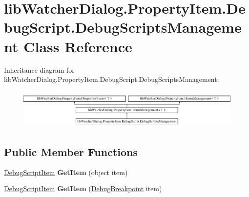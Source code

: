 \hypertarget{classlib_watcher_dialog_1_1_property_item_1_1_debug_script_1_1_debug_scripts_management}{\section{lib\+Watcher\+Dialog.\+Property\+Item.\+Debug\+Script.\+Debug\+Scripts\+Management Class Reference}
\label{classlib_watcher_dialog_1_1_property_item_1_1_debug_script_1_1_debug_scripts_management}
}
Inheritance diagram for lib\+Watcher\+Dialog.\+Property\+Item.\+Debug\+Script.\+Debug\+Scripts\+Management\+:\begin{figure}[H]
\begin{center}
\leavevmode
\includegraphics[height=2.014389cm]{classlib_watcher_dialog_1_1_property_item_1_1_debug_script_1_1_debug_scripts_management}
\end{center}
\end{figure}
\subsection*{Public Member Functions}
\begin{DoxyCompactItemize}
\item 
\hypertarget{classlib_watcher_dialog_1_1_property_item_1_1_debug_script_1_1_debug_scripts_management_ad36561f17343d22ffec46c6e597396d6}{\hyperlink{classlib_watcher_dialog_1_1_property_item_1_1_debug_script_1_1_debug_script_item}{Debug\+Script\+Item} {\bfseries Get\+Item} (object item)}\label{classlib_watcher_dialog_1_1_property_item_1_1_debug_script_1_1_debug_scripts_management_ad36561f17343d22ffec46c6e597396d6}

\item 
\hypertarget{classlib_watcher_dialog_1_1_property_item_1_1_debug_script_1_1_debug_scripts_management_a25b8e9fbe937bdc53baccec59946a679}{\hyperlink{classlib_watcher_dialog_1_1_property_item_1_1_debug_script_1_1_debug_script_item}{Debug\+Script\+Item} {\bfseries Get\+Item} (\hyperlink{classlib_wather_debugger_1_1_breakpoint_1_1_debug_breakpoint}{Debug\+Breakpoint} item)}\label{classlib_watcher_dialog_1_1_property_item_1_1_debug_script_1_1_debug_scripts_management_a25b8e9fbe937bdc53baccec59946a679}

\end{DoxyCompactItemize}
